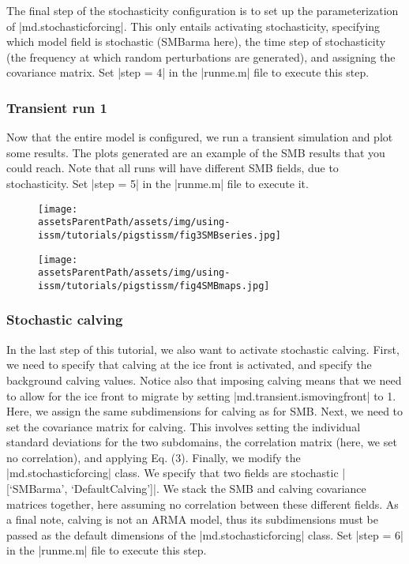 The final step of the stochasticity configuration is to set up the parameterization of \lstinlinebg|md.stochasticforcing|. This only entails activating stochasticity, specifying which model field is stochastic (SMBarma here), the time step of stochasticity (the frequency at which random perturbations are generated), and assigning the covariance matrix.
Set \lstinlinebg|step = 4| in the \lstinlinebg|runme.m| file to execute this step.

\subsubsection{Transient run 1}%
Now that the entire model is configured, we run a transient simulation and plot some results. The plots generated are an example of the SMB results that you could reach. Note that all runs will have different SMB fields, due to stochasticity. Set \lstinlinebg|step = 5| in the \lstinlinebg|runme.m| file to execute it.
\begin{figure}
	\begin{center}
		\texttt{[image: \\assetsParentPath/assets/img/using-issm/tutorials/pigstissm/fig3SMBseries.jpg]}
	\end{center}
\end{figure}
\begin{figure}
	\begin{center}
		\texttt{[image: \\assetsParentPath/assets/img/using-issm/tutorials/pigstissm/fig4SMBmaps.jpg]}
	\end{center}
\end{figure}

\subsubsection{Stochastic calving}%
In the last step of this tutorial, we also want to activate stochastic calving. First, we need to specify that calving at the ice front is activated, and specify the background calving values. Notice also that imposing calving means that we need to allow for the ice front to migrate by setting \lstinlinebg|md.transient.ismovingfront| to 1.
Here, we assign the same subdimensions for calving as for SMB. Next, we need to set the covariance matrix for calving. This involves setting the individual standard deviations for the two subdomains, the correlation matrix (here, we set no correlation), and applying Eq. (3). Finally, we modify the \lstinlinebg|md.stochasticforcing| class. We specify that two fields are stochastic \lstinlinebg|[{`SMBarma'}, {`DefaultCalving'}]|. We stack the SMB and calving covariance matrices together, here assuming no correlation between these different fields. As a final note, calving is not an ARMA model, thus its subdimensions must be passed as the default dimensions of the \lstinlinebg|md.stochasticforcing| class.
Set \lstinlinebg|step = 6| in the \lstinlinebg|runme.m| file to execute this step.


